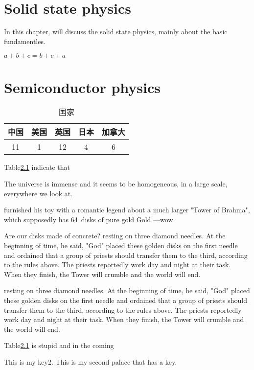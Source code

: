 \chapter{Solid state physics}
\label{Solid state physics}
In this chapter, will discuss the solid state physics, mainly about the basic fundamentles.

\begin{math}
	a + b + c = b + c + a
\end{math}

\begin{figure}

\end{figure}



\chapter{Semiconductor physics}
\label{Semiconductor physics}

	\begin{table}[H]
		\centering
		\caption{国家}
		\begin{tabular}{|c|c|c|c|c|}
			\hline
			中国 &美国 &英国 &日本&加拿大\\
			\hline
			11&1&12&4&6\\
			\hline
		\end{tabular}
		\label{tab2}    
	\end{table}
	
	Table\ref{tab2} indicate that
	
	The universe is immense and it seems to be homogeneous, 
	in a large scale, everywhere we look at.
	
	furnished his toy with a romantic legend about a much larger
	"Tower of Brahma", which supposedly has 64~disks of pure gold
	Gold ---wow.\par Are our disks made of concrete? 
	resting on three diamond needles. At the beginning of time, he said,
	"God" placed these golden disks on the first needle and ordained that a
	group of priests should transfer them to the third, according to the
	rules above. The priests reportedly work day and night at their task.
	When they finish, the Tower will crumble and the world will end.
	
	resting on three diamond needles. At the beginning of time, he said,
	"God" placed these golden disks on the first needle and ordained that a
	group of priests should transfer them to the third, according to the
	rules above. The priests reportedly work day and night at their task.
	When they finish, the Tower will crumble and the world will end.
	
	Table\ref{tab2} is stupid and in the coming


	This is my key2.
	This is my second palace that has a key.
